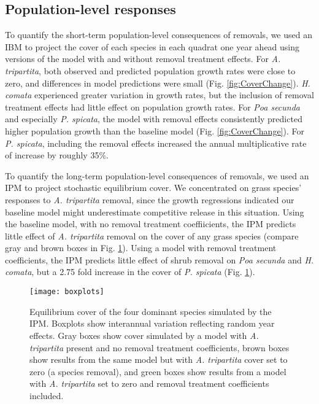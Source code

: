\documentclass[11pt]{article}
\begin{document}
\begin{doublespacing}
\subsection*{Population-level responses}

To quantify the short-term population-level consequences of removals, we used an IBM to project the cover of each species in each quadrat one year ahead using versions of the model with and without removal treatment effects. For \textit{A. tripartita}, both observed and predicted population growth rates were close to zero, and differences in model predictions were small (Fig. \ref{fig:CoverChange}). \textit{H. comata} experienced greater variation in growth rates, but the inclusion of removal treatment effects had little effect on population growth rates. For \textit{Poa secunda} and especially \textit{P. spicata}, the model with removal effects consistently predicted higher population growth than the baseline model  (Fig. \ref{fig:CoverChange}). For \textit{P. spicata}, including the removal effects increased the annual multiplicative rate of increase by roughly 35\%.

To quantify the long-term population-level consequences of removals, we used an IPM to project stochastic equilibrium cover. We concentrated on grass species' responses to \textit{A. tripartita} removal, since the growth regressions indicated our baseline model might underestimate competitive release in this situation. Using the baseline model, with no removal treatment coeffiicients, the IPM predicts little effect of \textit{A. tripartita} removal on the cover of any grass species (compare gray and brown boxes in Fig. \ref{fig:IPMresults}). Using a model with removal treatment coefficients, the IPM predicts little effect of shrub removal on \textit{Poa secunda} and \textit{H. comata}, but a 2.75 fold increase in the cover of \textit{P. spicata} (Fig. \ref{fig:IPMresults}).

 \begin{figure}[tbp]
 \centering
 \texttt{[image: boxplots]}
 \caption{Equilibrium cover of the four dominant species simulated by the IPM. Boxplots show interannual variation reflecting random year effects. Gray boxes show cover simulated by a model with \textit{A. tripartita} present and no removal treatment coefficients, brown boxes show results from the same model but with \textit{A. tripartita} cover set to zero (a species removal), and green boxes show results from a model with  \textit{A. tripartita} set to zero and removal treatment coefficients included.  }
 \label{fig:IPMresults}
 \end{figure}


\end{doublespacing}
\end{document}
